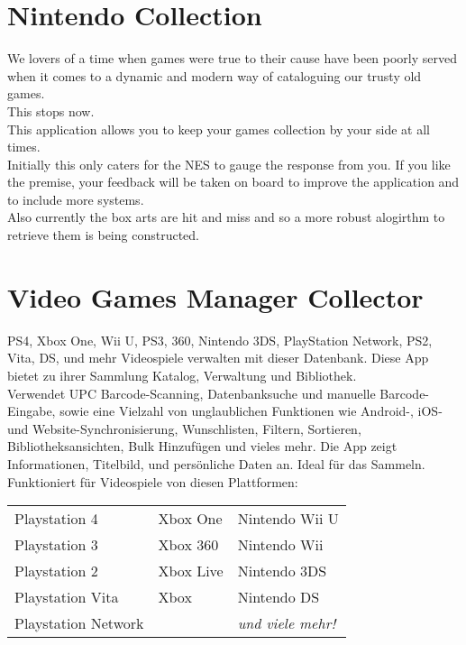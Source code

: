 \section{Nintendo Collection}

We lovers of a time when games were true to their cause have been poorly served when it comes to a dynamic and modern way of cataloguing our trusty old games.\\

This stops now.\\

This application allows you to keep your games collection by your side at all times.\\

Initially this only caters for the NES to gauge the response from you. If you like the premise, your feedback will be taken on board to improve the application and to include more systems.\\

Also currently the box arts are hit and miss and so a more robust alogirthm to retrieve them is being constructed.\cite{NC}

\section{Video Games Manager Collector}

PS4, Xbox One, Wii U, PS3, 360, Nintendo 3DS, PlayStation Network, PS2, Vita, DS, und mehr Videospiele verwalten mit dieser Datenbank. Diese App bietet zu ihrer Sammlung Katalog, Verwaltung und Bibliothek.\\

Verwendet UPC Barcode-Scanning, Datenbanksuche und manuelle Barcode-Eingabe, sowie eine Vielzahl von unglaublichen Funktionen wie Android-, iOS- und Website-Synchronisierung, Wunschlisten, Filtern, Sortieren, Bibliotheksansichten, Bulk Hinzufügen und vieles mehr. Die App zeigt Informationen, Titelbild, und persönliche Daten an. Ideal für das Sammeln.\cite{VGMC} \\

Funktioniert für Videospiele von diesen Plattformen:\\

\begin{tabular}{lll}
	Playstation 4 & Xbox One & Nintendo Wii U \\
	Playstation 3 & Xbox 360 & Nintendo Wii \\
	Playstation 2 & Xbox Live & Nintendo 3DS \\
	Playstation Vita & Xbox & Nintendo DS \\
	Playstation Network & & \emph{und viele mehr!} \\
\end{tabular}

